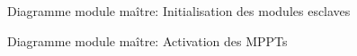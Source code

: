 		\begin{figure}[H]
			\centering
			\caption{Diagramme module maître: Initialisation des modules esclaves}
			\label{fig:diagrammefonctionnelmaitreinitesclave}
		\end{figure}

		\begin{figure}[H]
			\centering
			\caption{Diagramme module maître: Activation des MPPTs}
			\label{fig:diagrammefonctionnelactivationmppt}
		\end{figure}

